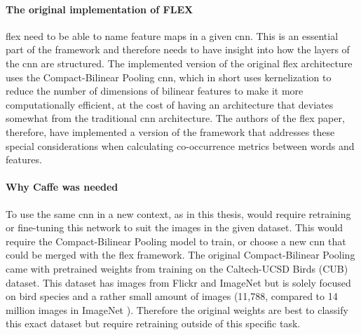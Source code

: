             
            \paragraph{The original implementation of FLEX\\}
            \gls{flex} need to be able to name feature maps in a given \gls{cnn}. This is an essential part of the framework and therefore needs to have insight into how the layers of the \gls{cnn} are structured.
            The implemented version of the original \gls{flex} architecture uses the Compact-Bilinear Pooling \gls{cnn}, which in short uses kernelization to reduce the number of dimensions of bilinear features to make it more computationally efficient, at the cost of having an architecture that deviates somewhat from the traditional \gls{cnn} architecture. The authors of the \gls{flex} paper, therefore, have implemented a version of the framework that addresses these special considerations when calculating co-occurrence metrics between words and features. 
        

            \paragraph{Why Caffe was needed\\}
            To use the same \gls{cnn} in a new context, as in this thesis, would require retraining or fine-tuning this network to suit the images in the given dataset. This would require the Compact-Bilinear Pooling model to train, or choose a new \gls{cnn} that could be merged with the \gls{flex} framework. The original Compact-Bilinear Pooling came with pretrained weights from training on the Caltech-UCSD Birds (CUB) \cite{PeronaLabCUB2002011} dataset. This dataset has images from Flickr and ImageNet but is solely focused on bird species and a rather small amount of images (11,788, compared to 14 million images in ImageNet \cite{dengImageNetLargeScaleHierarchical2009}). Therefore the original weights are best to classify this exact dataset but require retraining outside of this specific task.

